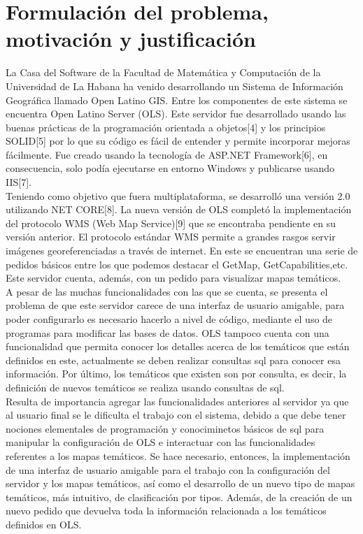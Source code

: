 \section{Formulaci\'on del problema, motivaci\'on y justificaci\'on}

La Casa del Software de la Facultad de Matem\'atica y Computaci\'on de la Universidad de La Habana ha venido desarrollando un Sistema de Informaci\'on Geogr\'afica llamado Open Latino GIS. Entre los componentes de este sistema se encuentra Open Latino Server (OLS). Este servidor fue desarrollado usando las buenas pr\'acticas de la programaci\'on orientada a objetos[4] y los principios SOLID[5] por lo que su c\'odigo es f\'acil de entender y permite incorporar mejoras f\'acilmente. Fue creado usando la tecnolog\'ia de ASP.NET Framework[6], en consecuencia, solo pod\'ia ejecutarse en entorno Windows y publicarse usando IIS[7].\\

Teniendo como objetivo que fuera multiplataforma, se desarroll\'o una versi\'on 2.0 utilizando NET CORE[8]. La nueva versi\'on de OLS complet\'o la implementaci\'on del protocolo WMS (Web Map Service)[9] que se encontraba pendiente en su versi\'on anterior. El protocolo est\'andar WMS permite a grandes rasgos servir im\'agenes georeferenciadas a trav\'es de internet. En este se encuentran una serie de pedidos b\'asicos entre los que podemos destacar el GetMap, GetCapabilities,etc. Este servidor cuenta, adem\'as, con un pedido para visualizar mapas tem\'aticos.\\

A pesar de las muchas funcionalidades con las que se cuenta, se presenta el problema de que este servidor carece de una interfaz de usuario amigable, para poder configurarlo es necesario hacerlo a nivel de c\'odigo, mediante el uso de programas para modificar las bases de datos. OLS tampoco cuenta con una funcionalidad que permita conocer los detalles acerca de los tem\'aticos que est\'an definidos en este, actualmente se deben realizar consultas sql para conocer esa informaci\'on. Por \'ultimo, los tem\'aticos que existen son por consulta, es decir, la definici\'on de nuevos tem\'aticos se realiza usando consultas de sql.\\

Resulta de importancia agregar las funcionalidades anteriores al servidor ya que al usuario final se le dificulta el trabajo con el sistema, debido a que debe tener nociones elementales de programaci\'on y conociminetos b\'asicos de sql para manipular la configuraci\'on de OLS e interactuar con las funcionalidades referentes a los mapas tem\'aticos. Se hace necesario, entonces, la implementaci\'on de una interfaz de usuario amigable para el trabajo con la configuraci\'on del servidor y los mapas tem\'aticos, as\'i como el desarrollo de un nuevo tipo de mapas tem\'aticos, m\'as intuitivo, de clasificaci\'on por tipos. Adem\'as, de la creaci\'on de un nuevo pedido que devuelva toda la informaci\'on relacionada a los tem\'aticos definidos en OLS.\\


